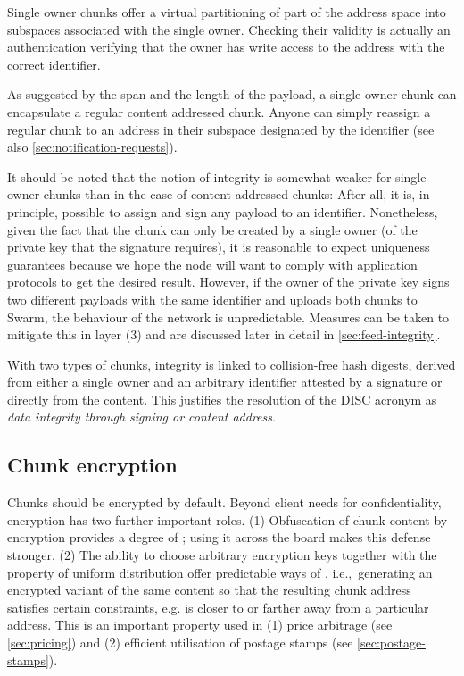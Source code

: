 Single owner chunks offer a virtual partitioning of part of the address space into subspaces associated with the single owner. Checking their validity is actually an authentication verifying that the owner has write access to the address with the correct identifier.

As suggested by the span and the length of the payload, a single owner chunk can encapsulate a regular content addressed chunk. Anyone can simply reassign a regular chunk to an address in their subspace designated by the identifier (see also \ref{sec:notification-requests}).


It should be noted that the notion of integrity is somewhat weaker for single owner chunks than in the case of content addressed chunks: After all, it is, in principle, possible to assign and sign any payload to an identifier. Nonetheless, given the fact that the chunk can only be created by a single owner (of the private key that the signature requires), it is reasonable to expect uniqueness guarantees because we hope the node will want to comply with application protocols to get the desired result. However, if the owner of the private key signs two different payloads with the same identifier and uploads both chunks to Swarm, the behaviour of the network is unpredictable. Measures can be taken to mitigate this in layer (3) and are discussed later in detail in \ref{sec:feed-integrity}.

With two types of chunks, integrity is linked to collision-free hash digests, derived from either a single owner and an arbitrary identifier attested by a signature or directly from the content. This justifies the resolution of the DISC acronym as \emph{data integrity through signing or content address}.

\subsection{Chunk encryption\statusgreen}\label{sec:chunk-encryption}

Chunks should be encrypted by default. Beyond client needs for confidentiality, encryption has two further important roles. (1) Obfuscation of chunk content by encryption provides a degree of ; using it across the board makes this defense stronger. (2) The ability to choose arbitrary encryption keys together with the property of uniform distribution offer predictable ways of , i.e.,\ generating an encrypted variant of the same content so that the resulting chunk address satisfies certain constraints, e.g. is closer to or farther away from a particular address. This is an important property used in (1) price arbitrage (see \ref{sec:pricing}) and (2) efficient utilisation of postage stamps (see \ref{sec:postage-stamps}).


